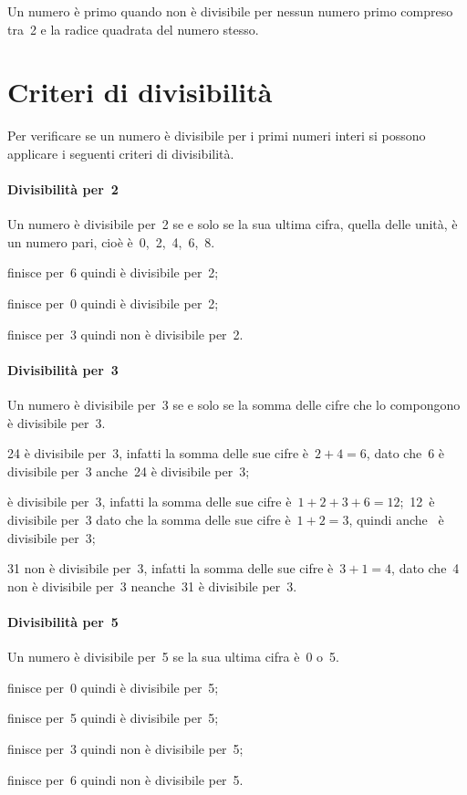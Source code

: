 \osservazione Un numero è primo quando non è divisibile per nessun numero primo compreso tra~2 e
la radice quadrata del numero stesso.

\vspazio\ovalbox{\risolvii \ref{ese:1.15}, \ref{ese:1.16}}


\section{Criteri di divisibilità}\label{sect:criteri_divisibilita}

Per verificare se un numero è divisibile per i primi numeri interi si possono applicare i seguenti criteri di
divisibilità.

\paragraph{Divisibilità per~2} Un numero è divisibile per~2 se e solo se la sua ultima cifra, quella delle unità,
è un numero pari, cioè è~0,~2,~4,~6,~8.

\begin{itemize*}
 \item {} finisce per~6 quindi è divisibile per~2;
 \item {} finisce per~0 quindi è divisibile per~2;
 \item {} finisce per~3 quindi non è divisibile per~2.
\end{itemize*}

\paragraph{Divisibilità per~3} Un numero è divisibile per~3 se e solo se la somma delle cifre che lo
compongono è divisibile per~3.
\begin{itemize*}
 \item 24 è divisibile per~3, infatti la somma delle sue cifre è~$2+4=6$, dato che~6 è divisibile per~3
anche~24 è divisibile per~3;
 \item {} è divisibile per~3, infatti la somma delle sue cifre è~$1+2+3+6=12$;~12~è divisibile per~3
dato che la somma delle sue cifre è~$1+2=3$, quindi anche~ è divisibile per~3;
 \item 31 non è divisibile per~3, infatti la somma delle sue cifre è~$3+1=4$, dato che~4 non è
divisibile per~3 neanche~31 è divisibile per~3.
\end{itemize*}

\paragraph{Divisibilità per~5} Un numero è divisibile per~5 se la sua ultima cifra è~0 o~5.
\begin{itemize*}
 \item {} finisce per~0 quindi è divisibile per~5;
 \item {} finisce per~5 quindi è divisibile per~5;
 \item {} finisce per~3 quindi non è divisibile per~5;
 \item {} finisce per~6 quindi non è divisibile per~5.
\end{itemize*}

